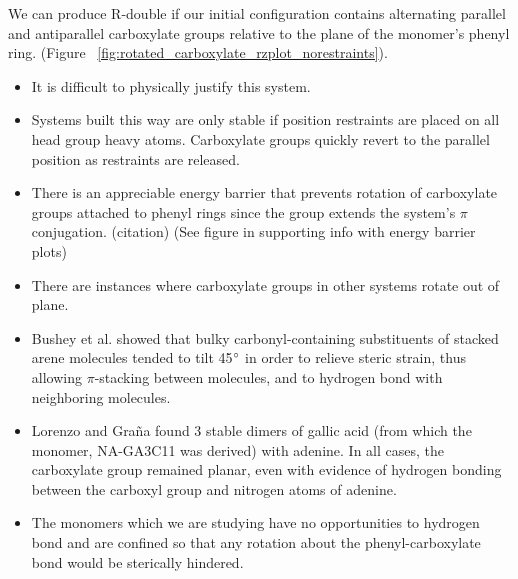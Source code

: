 \documentclass{article}
\begin{document}
  We can produce R-double if our initial configuration contains alternating parallel and
  antiparallel carboxylate groups relative to the plane of the monomer's phenyl ring.
  (Figure ~\ref{fig:rotated_carboxylate_rzplot_norestraints}).  
  \begin{itemize}
  		\item It is difficult to physically justify this system. 
  		\item Systems built this way are only stable if position restraints are placed on 
  		all head group heavy atoms. Carboxylate groups quickly revert to the parallel
  		position as restraints are released.
  		\item There is an appreciable energy barrier that prevents rotation
  		of carboxylate groups attached to phenyl rings since the group extends the system's 
  		$\pi$ conjugation. (citation) (See figure in supporting info with energy barrier plots)
  		\item There are instances where carboxylate groups in other systems rotate out of plane.
  		\item Bushey et al. showed that bulky carbonyl-containing substituents of stacked arene
  		molecules tended to tilt 45$\degree$ in order to relieve steric strain, thus allowing 
  		$\pi$-stacking between molecules, and to hydrogen bond with neighboring molecules. 
  		\item Lorenzo and Gra\~{n}a found 3 stable dimers of gallic acid (from which the 
  		monomer, NA-GA3C11 was derived) with adenine. In all cases, the carboxylate group 
  		remained planar, even with evidence of hydrogen bonding between the carboxyl group
  		and nitrogen atoms of adenine. 
  		\item The monomers which we are studying have no opportunities to hydrogen bond and 
  		are confined so that any rotation about the phenyl-carboxylate bond would be sterically
  		hindered. 
  \end{itemize}
  
\end{document}
